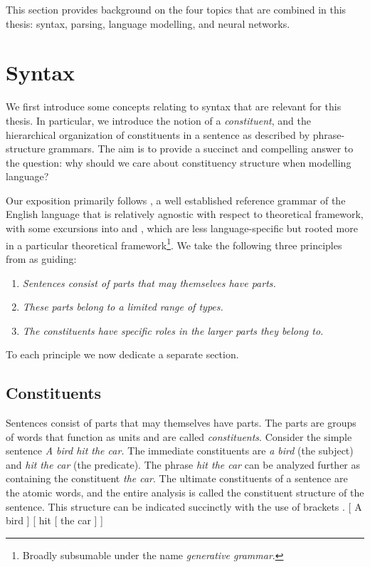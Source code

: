 This section provides background on the four topics that are combined in this thesis: syntax, parsing, language modelling, and neural networks.

\section{Syntax}
We first introduce some concepts relating to syntax that are relevant for this thesis. In particular, we introduce the notion of a \textit{constituent}, and the hierarchical organization of constituents in a sentence as described by phrase-structure grammars. The aim is to provide a succinct and compelling answer to the question: why should we care about constituency structure when modelling language?

Our exposition primarily follows \citet{huddleston2002grammar}, a well established reference grammar of the English language that is relatively agnostic with respect to theoretical framework, with some excursions into \citet{carnie2010constituent} and \citet{everaert2015structures}, which are less language-specific but rooted more in a particular theoretical framework\footnote{Broadly subsumable under the name \textit{generative grammar}.}. We take the following three principles from \citet{huddleston2002grammar} as guiding:
\begin{enumerate}[noitemsep]
  \item \textit{Sentences consist of parts that may themselves have parts.}
  \item \textit{These parts belong to a limited range of types.}
  \item \textit{The constituents have specific roles in the larger parts they belong to.}
\end{enumerate}
To each principle we now dedicate a separate section.

\subsection{Constituents}
Sentences consist of parts that may themselves have parts. The parts are groups of words that function as units and are called \textit{constituents}. Consider the simple sentence \textit{A bird hit the car.} The immediate constituents are \textit{a bird} (the subject) and \textit{hit the car} (the predicate). The phrase \textit{hit the car} can be analyzed further as containing the constituent \textit{the car}. The ultimate constituents of a sentence are the atomic words, and the entire analysis is called the constituent structure of the sentence. This structure can be indicated succinctly with the use of brackets
\exi. [ A bird ] [ hit [ the car ] ]

